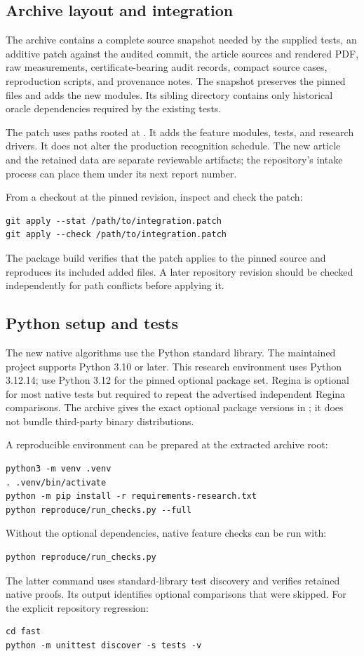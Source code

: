 \subsection{Archive layout and integration}

The archive contains a complete source snapshot needed by the supplied
tests, an additive patch against the audited commit, the article sources
and rendered PDF, raw measurements, certificate-bearing audit records,
compact source cases, reproduction scripts, and provenance notes. The
 snapshot preserves the pinned files and adds the new modules.
Its sibling  directory contains only historical oracle
dependencies required by the existing tests.

The patch uses paths rooted at .
It adds the feature modules, tests, and research drivers. It does not alter
the production recognition schedule. The new article and the retained
data are separate reviewable artifacts; the repository's intake process
can place them under its next report number.

From a checkout at the pinned revision, inspect and check the patch:
\begin{lstlisting}
git apply --stat /path/to/integration.patch
git apply --check /path/to/integration.patch
\end{lstlisting}
The package build verifies that the patch applies to the pinned source
and reproduces its included added files. A later repository revision
should be checked independently for path conflicts before applying it.

\subsection{Python setup and tests}

The new native algorithms use the Python standard library. The maintained
project supports Python 3.10 or later. This research environment uses
Python 3.12.14; use Python 3.12 for the pinned optional package set.
Regina is optional for most native tests but required to
repeat the advertised independent Regina comparisons. The archive gives
the exact optional package versions in ;
it does not bundle third-party binary distributions.

A reproducible environment can be prepared at the extracted archive root:
\begin{lstlisting}
python3 -m venv .venv
. .venv/bin/activate
python -m pip install -r requirements-research.txt
python reproduce/run_checks.py --full
\end{lstlisting}
Without the optional dependencies, native feature checks can be run with:
\begin{lstlisting}
python reproduce/run_checks.py
\end{lstlisting}
The latter command uses standard-library test discovery and verifies
retained native proofs. Its output identifies optional comparisons
that were skipped. For the explicit repository regression:
\begin{lstlisting}
cd fast
python -m unittest discover -s tests -v
\end{lstlisting}

